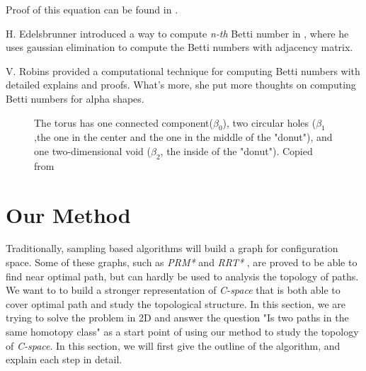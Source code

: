 \documentclass[11pt]{article}
\begin{document}
\indent Proof of this equation can be found in \cite{cyclomatic}.



\indent H. Edelsbrunner introduced a way to compute \emph{n-th} Betti number in \cite{Edel Book}, where he uses gaussian elimination to compute the Betti numbers with adjacency matrix.

\indent V. Robins \cite{alpha betti} provided a computational technique for computing Betti numbers with detailed explains and proofs. What's more, she put more thoughts on computing Betti numbers for alpha shapes.

\begin{figure}
	\caption{\label{fig:Torus} The torus has one connected component($\beta_0$), two circular holes ($\beta_1$,the one in the center and the one in the middle of the "donut"), and one two-dimensional void ($\beta_2$, the inside of the "donut"). Copied from \cite{betti wiki}}
\end{figure}


%

\section{Our Method}\label{method} 

\indent \indent Traditionally, sampling based algorithms will build a graph for configuration space. Some of these graphs, such as \emph{PRM*} and \emph{RRT*} \cite{prmstar}, are proved to be able to find near optimal path, but can hardly be used to analysis the topology of paths. We want to to build a stronger representation of \emph{C-space} that is both able to cover optimal path and study the topological structure. In this section, we are trying to solve the problem in 2D and answer the question "Is two paths in the same homotopy class" as a start point of using our method to study the topology of \emph{C-space}. In this section, we will first give the outline of the algorithm, and explain each step in detail. 
\end{document}
